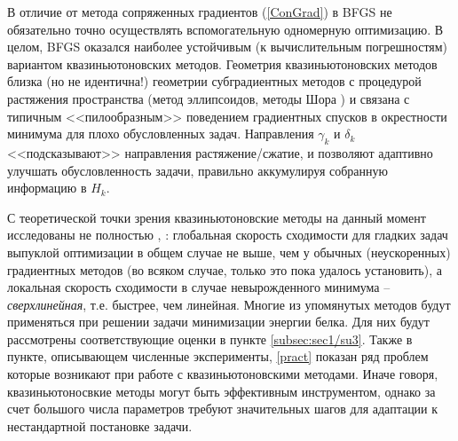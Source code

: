   В отличие от метода сопряженных градиентов (\ref{ConGrad}) в BFGS не обязательно точно осуществлять вспомогательную одномерную оптимизацию. В целом, BFGS оказался наиболее устойчивым (к вычислительным погрешностям) вариантом квазиньютоновских методов. Геометрия квазиньютоновских методов близка (но не идентична!) геометрии субградиентных методов с процедурой растяжения пространства (метод эллипсоидов, методы Шора \cite{Polyak1983}) и связана с типичным <<пилообразным>> поведением градиентных спусков в окрестности минимума для плохо обусловленных задач. Направления $\gamma _k $ и $\delta _k $ <<подсказывают>> направления растяжение/сжатие, и позволяют адаптивно улучшать обусловленность задачи, правильно аккумулируя собранную информацию в $H_k $. 

  С теоретической точки зрения квазиньютоновские методы на данный момент исследованы не полностью \cite{nesterov2013introductory}, \cite{nocedal2006sequential}: глобальная скорость сходимости для гладких задач выпуклой оптимизации в общем случае не выше, чем у обычных (неускоренных) градиентных методов (во всяком случае, только это пока удалось установить), а локальная скорость сходимости в случае невырожденного минимума -- \textit{сверхлинейная}, т.е. быстрее, чем линейная. Многие из упомянутых методов будут применяться при решении задачи минимизации энергии белка. Для них будут рассмотрены соответствующие оценки в пункте \ref{subsec:sec1/su3}. Также в пункте, описывающем численные эксперименты, \ref{pract} показан ряд проблем которые возникают при работе с квазиньютоновскими методами. Иначе говоря, квазиньютоносвкие методы могут быть эффективным инструментом, однако за счет большого числа параметров требуют значительных шагов для адаптации к нестандартной постановке задачи.
